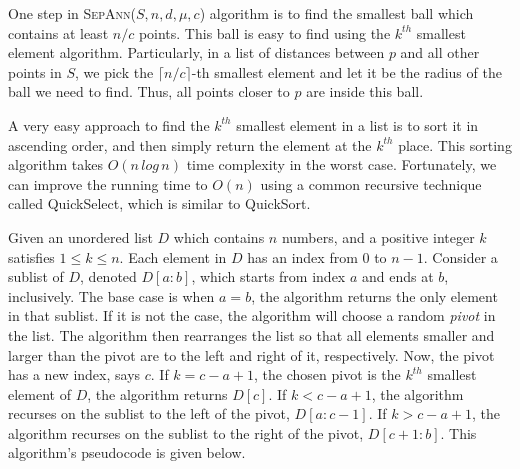 \documentclass[12pt,english,]{article}
\begin{document}
One step in \textsc{SepAnn($S,n,d,\mu,c$)} algorithm is to find the
smallest ball which contains at least \(n/c\) points. This ball is easy
to find using the \(k^{th}\) smallest element algorithm. Particularly,
in a list of distances between \(p\) and all other points in \(S\), we
pick the \(\lceil n/c\rceil\)-th smallest element and let it be the
radius of the ball we need to find. Thus, all points closer to \(p\) are
inside this ball.

A very easy approach to find the \(k^{th}\) smallest element in a list
is to sort it in ascending order, and then simply return the element at
the \(k^{th}\) place. This sorting algorithm takes \(O(n\,log\,n)\) time
complexity in the worst case. Fortunately, we can improve the running
time to \(O(n)\) using a common recursive technique called QuickSelect,
which is similar to QuickSort.

Given an unordered list \(D\) which contains \(n\) numbers, and a
positive integer \(k\) satisfies \(1 \leq k \leq n\). Each element in
\(D\) has an index from \(0\) to \(n-1\). Consider a sublist of \(D\),
denoted \(D[a:b]\), which starts from index \(a\) and ends at \(b\),
inclusively. The base case is when \(a = b\), the algorithm returns the
only element in that sublist. If it is not the case, the algorithm will
choose a random \emph{pivot} in the list. The algorithm then rearranges
the list so that all elements smaller and larger than the pivot are to
the left and right of it, respectively. Now, the pivot has a new index,
says \(c\). If \(k = c-a+1\), the chosen pivot is the \(k^{th}\)
smallest element of \(D\), the algorithm returns \(D[c]\). If
\(k < c-a+1\), the algorithm recurses on the sublist to the left of the
pivot, \(D[a:c-1]\). If \(k > c-a+1\), the algorithm recurses on the
sublist to the right of the pivot, \(D[c+1:b]\). This algorithm's
pseudocode is given below.
\end{document}
